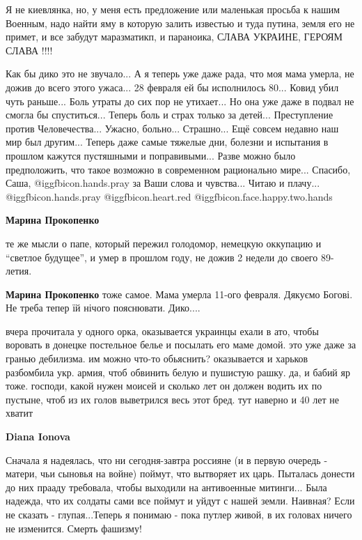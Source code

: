 \begin{itemize}
\begin{itemize}
\end{itemize} %


Я не киевлянка, но, у меня есть предложение или маленькая просьба к нашим
Военным, надо найти яму в которую залить известью и туда путина, земля его не
примет, и все забудут маразматикп, и параноика, СЛАВА УКРАИНЕ, ГЕРОЯМ СЛАВА
!!!!

\obeycr
Как бы дико это не звучало...
А я теперь уже даже рада, что моя мама умерла, не дожив до всего этого ужаса...
28 февраля ей бы исполнилось 80...
Ковид убил чуть раньше...
Боль утраты до сих пор не утихает...
Но она уже даже в подвал не смогла бы спуститься...
Теперь боль и страх только за детей...
Преступление против Человечества...
Ужасно, больно...
Страшно...
Ещё совсем недавно наш мир был другим...
Теперь даже самые тяжелые дни, болезни и испытания в прошлом кажутся пустяшными и поправивыми...
Разве можно было предположить, что такое возможно в современном рационально мире...
Спасибо, Саша,  @igg{fbicon.hands.pray}  за Ваши слова и чувства...
Читаю и плачу...
 @igg{fbicon.hands.pray} @igg{fbicon.heart.red} @igg{fbicon.face.happy.two.hands} 
\restorecr

\begin{itemize} %
\textbf{Марина Прокопенко} 

те же мысли о папе, который пережил голодомор, немецкую оккупацию и
\enquote{светлое будущее}, и умер в прошлом году, не дожив 2 недели до своего
89-летия.

\textbf{Марина Прокопенко} тоже самое. Мама умерла 11-ого февраля. Дякуємо Богові. Не треба тепер їй нічого пояснювати. Дико....


вчера прочитала у одного орка, оказывается украинцы ехали в ато, чтобы воровать
в донецке постельное белье и посылать его маме домой. это уже даже за гранью
дебилизма. им можно что-то обьяснить? оказывается и харьков разбомбила укр.
армия, чтоб обвинить белую и пушистую рашку. да, и бабий яр тоже. господи,
какой нужен моисей и сколько лет он должен водить их по пустыне, чтоб из их
голов выветрился весь этот бред. тут наверно и 40 лет не хватит

\textbf{Diana Ionova} 

Сначала я надеялась, что ни сегодня-завтра россияне (и в первую очередь -
матери, чьи сыновья на войне) поймут, что вытворяет их царь. Пыталась донести
до них прааду требовала, чтобы выходили на антивоенные митинги... Была надежда,
что их солдаты сами все поймут и уйдут с нашей земли. Наивная? Если не сказать
- глупая...Теперь я понимаю - пока путлер живой, в их головах ничего не
изменится. Смерть фашизму!


\end{itemize}
\end{itemize}
